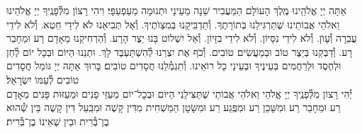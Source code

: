 \documentclass[twoside, openany, parskip=half, 11pt]{book}
\begin{document}
אַתָּה יְיָ אֱלֹהֵֽינוּ מֶֽלֶךְ הָעוֹלָם הַמַּעֲבִיר שֵׁנָה מֵעֵינָי וּתְנוּמָה מֵעַפְעַפָּי׃ וִיהִי רָצוֹן מִלְּ֯פָנֶֽיךָ יְיָ אֱלֹהֵינוּ וֵאלֹהֵי אֲבוֹתֵינוּ שֶׁתַּרְגִּילֵנוּ בְּתוֹרָתֶךָ. וְ֯תַדְבִּיקֵנוּ בְּמִצְוׂתֶיךָ. וְ֯אַל תְּבִיאֵנוּ לֹא לִידֵי חֵטְא. וְ֯לֹא לִידֵי עֲבֵרָה וְ֯עָוׂן. וְ֯לֹא לִידֵי נִסָּיוֹן. וְ֯לֹא לִידֵי בִזָּיוֹן. וְ֯אַל יִשְׁלוֹט בָּנוּ יֵצֶר הָרָע. וְ֯הַרְחִיקֵנוּ מֵאָדָם רָע וּמֵחָבֵר רָע. וְ֯דַבְּקֵנוּ בְּיֵצֶר טוֹב וּבְמַעֲשִׂים טוֹבִים. וְ֯כֹף אֶת יִצְרֵנוּ לְ֯הִשְׁתַּעְבֶּד לָךְ. וּתְנֵנוּ הַיּוֹם וּבְכָל יוֹם לְ֯חֵן וּלְחֶסֶד וּלְרַחֲמִים בְּעֵינֶיךָ וּבְעֵינֵי כָל רוֹאֵינוּ. וְ֯תִגְמְ֯לֵנוּ חֲסָדִים טוֹבִים׃ בָּרוּךְ אַתָּה יְיָ גּוֹמֵל חֲסָדִים טוֹבִים לְ֯עַמּוֹ יִשְׂרָאֵל׃\\
יְ֯הִי רָצוֹן מִלְּ֯פָנֶֽיךָ יְיָ אֱלֹהַי וֵאלֹהֵי אֲבוֹתַי שֶׁתַּצִּילֵֽנִי הַיּוֹם וּבְכׇל־יוֹם מֵעַזֵּי פָנִים וּמֵעַזּוּת פָּנִים מֵאָדָם רַע וּמֵחָבֵר רַע וּמִשָּׁכֵן רַע וּמִפֶּֽגַע רַע וּמִשָּׂטָן הַמַּשְׁחִית מִדִּין קָשֶׁה וּמִבַּֽעַל דִּין קָשֶׁה בֵּין שְׁ֯הוּא בֶן־בְּ֯רִית וּבֵין שֶׁאֵינוֹ בֶן־בְּ֯רִית׃
\end{document}
